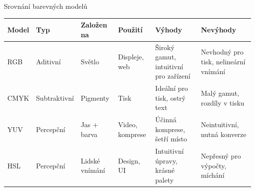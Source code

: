 \documentclass[aspectratio=169,xcolor=dvipsnames, t]{beamer}
\begin{document}
{\begin{frame}{Srovnání barevných modelů}
    \centering
    \footnotesize %
    \begin{tabularx}{\textwidth}{l l l l X X}
        \toprule
        \textbf{Model} & \textbf{Typ} & \textbf{Založen na} & \textbf{Použití} & \textbf{Výhody} & \textbf{Nevýhody} \\
        \midrule
        RGB  & Aditivní   & Světlo         & Displeje, web      & Široký gamut, intuitivní pro zařízení & Nevhodný pro tisk, nelineární vnímání \\
        CMYK & Subtraktivní & Pigmenty     & Tisk               & Ideální pro tisk, ostrý text          & Malý gamut, rozdíly v tisku \\
        YUV  & Percepční  & Jas + barva    & Video, komprese    & Účinná komprese, šetří místo          & Neintuitivní, nutná konverze \\
        HSL  & Percepční  & Lidské vnímání & Design, UI         & Intuitivní úpravy, krásné palety      & Nepřesný pro výpočty, míchání \\
        \bottomrule
    \end{tabularx}

\end{frame}
}

\makefinalpage
\end{document}
